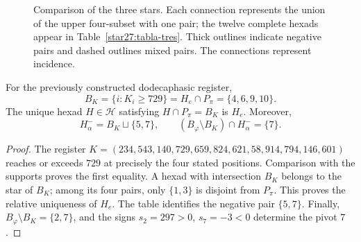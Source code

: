 \begin{figure}[htbp]
\centering
{}
\caption{Comparison of the three stars. Each connection represents
the union of the upper four-subset with one pair; the twelve complete
hexads appear in Table~\ref{star27:tabla-tres}. Thick outlines
indicate negative pairs and dashed outlines mixed pairs.
The connections represent incidence.}
\label{star27:figura}
\end{figure}

\begin{proposition}
\label{star27:acoplamiento}
For the previously constructed dodecaphasic register,
\[
B_K=\{i:K_i\geq729\}=H_e\cap P_\pi=\{4,6,9,10\}.
\]
The unique hexad \(H\in\mathcal H\) satisfying
\(H\cap P_\pi=B_K\) is \(H_e\). Moreover,
\[
H^-_\alpha=B_K\sqcup\{5,7\},\qquad
(B_\varphi\setminus B_K)\cap H^-_\alpha=\{7\}.
\]
\end{proposition}

\begin{proof}
The register
\(K=(234,543,140,729,659,824,621,58,914,794,146,601)\)
reaches or exceeds \(729\) at precisely the four stated
positions. Comparison with the supports proves the first
equality. A hexad with intersection \(B_K\) belongs to
the star of \(B_K\); among its four pairs, only
\(\{1,3\}\) is disjoint from \(P_\pi\). This proves
the relative uniqueness of \(H_e\). The table identifies
the negative pair \(\{5,7\}\). Finally,
\(B_\varphi\setminus B_K=\{2,7\}\), and the signs
\(s_2=297>0\), \(s_7=-3<0\) determine the pivot \(7\).
\end{proof}


